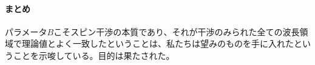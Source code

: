\paragraph{まとめ}
パラメータ$B$こそスピン干渉の本質であり、それが干渉のみられた全ての波長領域で理論値とよく一致したということは、私たちは望みのものを手に入れたということを示唆している。目的は果たされた。




